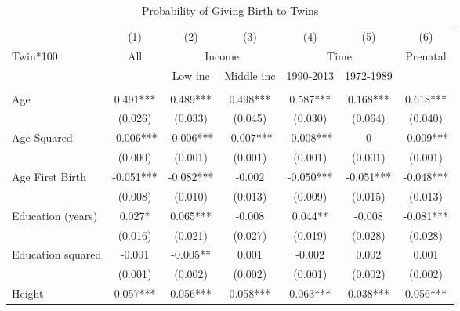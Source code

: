 \begin{landscape}\begin{table}[htpb!] 
\caption{Probability of Giving Birth to Twins} \label{TWINtab:twinreg1} 
\begin{center}\begin{tabular}{lcccccc} \toprule \toprule 
&(1)&(2)&(3)&(4)&(5)&(6)\\ 
Twin*100&All&\multicolumn{2}{c}{Income}&\multicolumn{2}{c}{Time}&Prenatal\\ 
 \cmidrule(r){3-4} \cmidrule(r){5-6} 
&&Low inc&Middle inc&1990-2013&1972-1989&\\ \midrule 
\begin{footnotesize}\end{footnotesize}& 
\begin{footnotesize}\end{footnotesize}& 
\begin{footnotesize}\end{footnotesize}& 
\begin{footnotesize}\end{footnotesize}& 
\begin{footnotesize}\end{footnotesize}& 
\begin{footnotesize}\end{footnotesize}& 
\begin{footnotesize}\end{footnotesize}\\ 
Age&0.491***&0.489***&0.498***&0.587***&0.168***&0.618***\\
&(0.026)&(0.033)&(0.045)&(0.030)&(0.064)&(0.040)\\
Age Squared&-0.006***&-0.006***&-0.007***&-0.008***&0&-0.009***\\
&(0.000)&(0.001)&(0.001)&(0.001)&(0.001)&(0.001)\\
Age First Birth&-0.051***&-0.082***&-0.002&-0.050***&-0.051***&-0.048***\\
&(0.008)&(0.010)&(0.013)&(0.009)&(0.015)&(0.013)\\
Education (years)&0.027*&0.065***&-0.008&0.044**&-0.008&-0.081***\\
&(0.016)&(0.021)&(0.027)&(0.019)&(0.028)&(0.028)\\
Education squared&-0.001&-0.005**&0.001&-0.002&0.002&0.001\\
&(0.001)&(0.002)&(0.002)&(0.001)&(0.002)&(0.002)\\
Height&0.057***&0.056***&0.058***&0.063***&0.038***&0.056***\\

\end{tabular}
\end{center}
\end{table}
\end{landscape}
